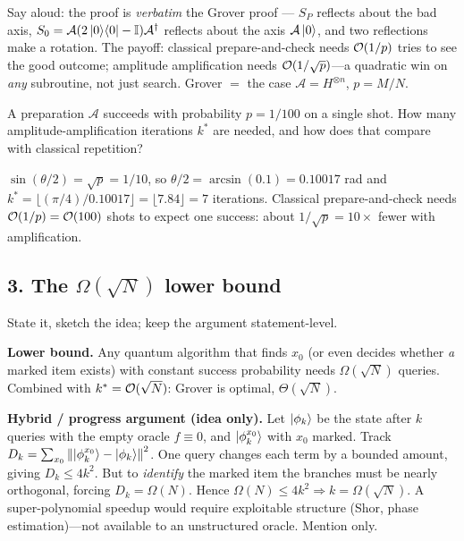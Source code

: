 \documentclass[11pt]{article}
\begin{document}
Say aloud: the proof is \emph{verbatim} the Grover proof --- $S_P$ reflects about
the bad axis, $S_0=\mathcal A(2\ket{0}\!\bra{0}-\mathbb{I})\mathcal A^{\dagger}$ reflects about the axis
$\mathcal A\ket0$, and two reflections make a rotation. The payoff: classical
prepare-and-check needs $\mathcal{O}(1/p)$ tries to see the good outcome; amplitude
amplification needs $\mathcal{O}(1/\sqrt p)$---a quadratic win on \emph{any} subroutine,
not just search. Grover $=$ the case $\mathcal A=H^{\otimes n}$, $p=M/N$.

\begin{inclass}\label{ic:l3-aa}
A preparation $\mathcal A$ succeeds with probability $p=1/100$ on a single shot. How
many amplitude-amplification iterations $k^\ast$ are needed, and how does that
compare with classical repetition?
\end{inclass}
\begin{answer}
$\sin(\theta/2)=\sqrt p=1/10$, so $\theta/2=\arcsin(0.1)=0.10017$ rad and
$k^\ast=\lfloor(\pi/4)/0.10017\rfloor=\lfloor7.84\rfloor=7$ iterations. Classical
prepare-and-check needs $\mathcal{O}(1/p)=\mathcal{O}(100)$ shots to expect one success: about
$1/\sqrt p=10\times$ fewer with amplification. \checkmark
\end{answer}

\subsection*{3. The $\Omega(\sqrt N)$ lower bound }
State it, sketch the idea; keep the argument statement-level.

\begin{board}
\textbf{Lower bound.} Any quantum algorithm that finds $x_0$ (or even decides
whether \emph{a} marked item exists) with constant success probability needs
$\Omega(\sqrt N)$ queries. Combined with $k^\ast=\mathcal{O}(\sqrt N)$: Grover is optimal,
$\Theta(\sqrt N)$.
\end{board}

\begin{advanced}
\textbf{Hybrid / progress argument (idea only).} Let $\ket{\phi_k}$ be the state
after $k$ queries with the empty oracle $f\equiv0$, and $\ket{\phi_k^{x_0}}$ with
$x_0$ marked. Track
$D_k=\sum_{x_0}\left\lVert \ket{\phi_k^{x_0}}-\ket{\phi_k} \right\rVert^2$. One query changes each
term by a bounded amount, giving $D_k\le 4k^2$. But to \emph{identify} the marked
item the branches must be nearly orthogonal, forcing $D_k=\Omega(N)$. Hence
$\Omega(N)\le 4k^2\Rightarrow k=\Omega(\sqrt N)$. A super-polynomial speedup would
require exploitable structure (Shor, phase estimation)---not available to an
unstructured oracle. Mention only.
\end{advanced}
\end{document}
